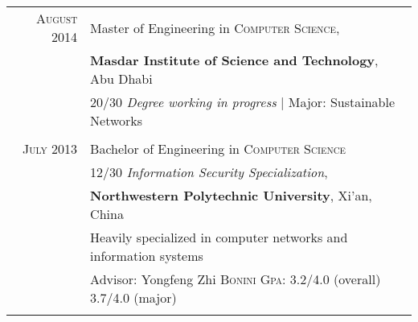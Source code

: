\documentclass[a4paper,10pt]{article} %
\begin{document}
\begin{tabular}{rl}	
\textsc{August} 2014 & Master of Engineering in \textsc{Computer
  Science}, \\ & \textbf{Masdar Institute of Science and Technology}, Abu Dhabi\\
& 20/30 \small\emph{Degree working in progress} | Major: Sustainable Networks\\
&\\


\textsc{July} 2013 & Bachelor of Engineering in
\textsc{}\textsc{Computer Science} \\& 12/30 \small\emph{Information
  Security Specialization},\\ &\normalsize\textbf{Northwestern
  Polytechnic University},
  Xi'an, China\\
& Heavily specialized in computer networks and information systems \\
&  \small Advisor: Yongfeng Zhi \textsc{Bonini} \normalsize
\textsc{Gpa}: 3.2/4.0 (overall) 3.7/4.0 (major)%
\\ 
 & \\




\end{tabular}

\end{document}
